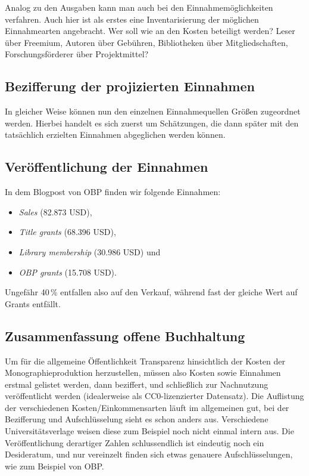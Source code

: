 \documentclass[a4paper,
fontsize=11pt,
oneside,
numbers=noperiodatend,
parskip=half-,
bibliography=totoc,
final
]{scrartcl}
\begin{document}
Analog zu den Ausgaben kann man auch bei den Einnahmemöglichkeiten
verfahren. Auch hier ist als erstes eine Inventarisierung der möglichen
Einnahmearten angebracht. Wer soll wie an den Kosten beteiligt werden?
Leser über Freemium, Autoren über Gebühren, Bibliotheken über
Mitgliedschaften, Forschungsförderer über Projektmittel?

\hypertarget{bezifferung-der-projizierten-einnahmen}{%
\subsection{Bezifferung der projizierten
Einnahmen}\label{bezifferung-der-projizierten-einnahmen}}

In gleicher Weise können nun den einzelnen Einnahmequellen Größen
zugeordnet werden. Hierbei handelt es sich zuerst um Schätzungen, die
dann später mit den tatsächlich erzielten Einnahmen abgeglichen werden
können.

\hypertarget{veruxf6ffentlichung-der-einnahmen}{%
\subsection{Veröffentlichung der
Einnahmen}\label{veruxf6ffentlichung-der-einnahmen}}

In dem Blogpost von OBP finden wir folgende Einnahmen:

\begin{itemize}
\item
  \emph{Sales} (82.873 USD),
\item
  \emph{Title grants} (68.396 USD),
\item
  \emph{Library membership} (30.986 USD) und
\item
  \emph{OBP grants} (15.708 USD).
\end{itemize}

Ungefähr 40\,\% entfallen also auf den Verkauf, während fast der gleiche
Wert auf Grants entfällt.

\hypertarget{zusammenfassung-offene-buchhaltung}{%
\subsection{Zusammenfassung offene
Buchhaltung}\label{zusammenfassung-offene-buchhaltung}}

Um für die allgemeine Öffentlichkeit Transparenz hinsichtlich der Kosten
der Monographieproduktion herzustellen, müssen also Kosten sowie
Einnahmen erstmal gelistet werden, dann beziffert, und schließlich zur
Nachnutzung veröffentlicht werden (idealerweise als CC0-lizenzierter
Datensatz). Die Auflistung der verschiedenen Kosten/Einkommensarten
läuft im allgemeinen gut, bei der Bezifferung und Aufschlüsselung sieht
es schon anders aus. Verschiedene Universitätsverlage weisen diese zum
Beispiel noch nicht einmal intern aus. Die Veröffentlichung derartiger
Zahlen schlussendlich ist eindeutig noch ein Desideratum, und nur
vereinzelt finden sich etwas genauere Aufschlüsselungen, wie zum
Beispiel von OBP.
\end{document}

